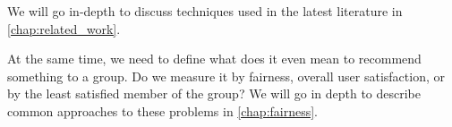 We will go in-depth to discuss techniques used in the latest literature in \ref{chap:related_work}.


At the same time, we need to define what does it even mean to recommend something to a group. Do we measure it by fairness, overall user satisfaction, or by the least satisfied member of the group? We will go in depth to describe common approaches to these problems in \ref{chap:fairness}.

